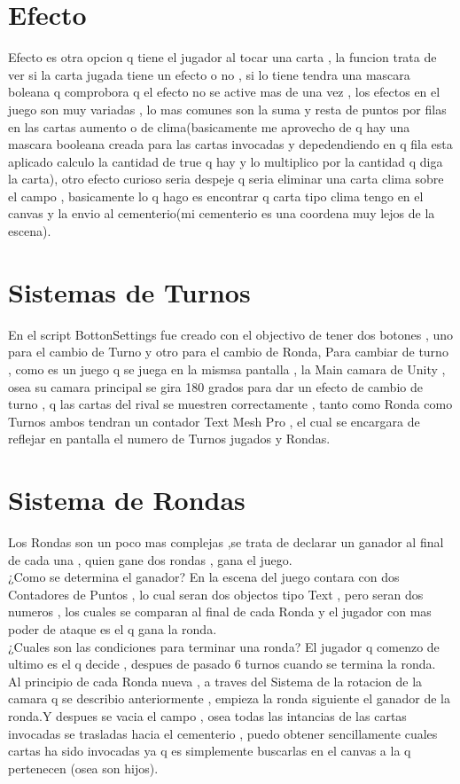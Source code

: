 \documentclass{article}
\begin{document}
\section{Efecto}
Efecto es otra opcion q tiene el jugador al tocar una carta , la funcion trata de ver si la carta jugada tiene un efecto o no , si lo tiene tendra una mascara boleana q comprobora q el efecto no se active mas de una vez , los efectos en el juego son muy variadas , lo mas comunes son la suma y resta de puntos por filas en las cartas aumento o de clima(basicamente me aprovecho de q hay una mascara booleana creada para las cartas invocadas y depedendiendo en q fila esta aplicado calculo la cantidad de true q hay y lo multiplico por la cantidad q diga la carta), otro efecto curioso seria despeje q seria eliminar una carta clima sobre el campo , basicamente lo q hago es encontrar q carta tipo clima tengo en el canvas y la envio al cementerio(mi cementerio es una coordena muy lejos de la escena).
\newpage
\section{Sistemas de Turnos}
En el script BottonSettings fue creado con el objectivo de tener dos botones , uno para el cambio de Turno y otro para el cambio de Ronda,
Para cambiar de turno , como es un juego q se juega en la mismsa pantalla , la Main camara de Unity , osea su camara principal se gira 180 grados para dar un efecto de cambio de turno , q las cartas del rival se muestren correctamente , tanto como Ronda como Turnos ambos tendran un contador Text Mesh Pro , el cual se encargara de reflejar en pantalla el numero de Turnos jugados y Rondas.
\section{Sistema de Rondas}
Los Rondas son un poco mas complejas ,se trata de declarar un ganador al final de cada una , quien gane dos rondas , gana el juego.\\ 
¿Como se determina el ganador?
En la escena del juego contara con dos Contadores de Puntos , lo cual seran dos objectos tipo Text , pero seran dos numeros , los cuales se comparan al final de cada Ronda y el jugador con mas poder de ataque es el q gana la ronda.\\
¿Cuales son las condiciones para terminar una ronda?
El jugador q comenzo de ultimo es el q decide , despues de pasado 6 turnos cuando se termina la ronda.\\
Al principio de cada Ronda nueva , a traves del Sistema de la rotacion de la camara q se describio anteriormente , empieza la ronda siguiente el ganador de la ronda.Y despues se vacia el campo , osea todas las intancias de las cartas invocadas se trasladas hacia el cementerio , puedo obtener sencillamente cuales cartas ha sido invocadas ya q es simplemente buscarlas en el canvas a la q pertenecen (osea son hijos).
\newpage
\end{document}
